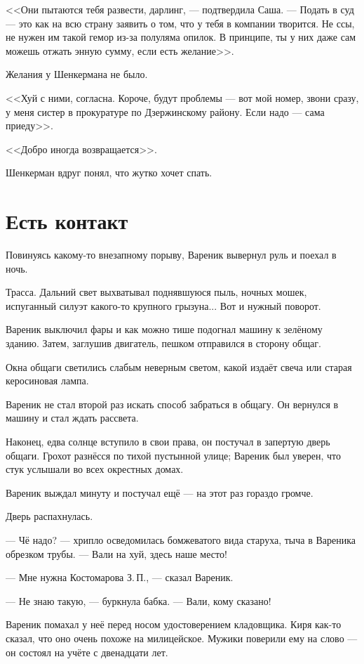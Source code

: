 \documentclass[a4paper,10pt,fleqn]{book}\usepackage{polyglossia}\setdefaultlanguage{english}\setotherlanguage{russian}\defaultfontfeatures{Ligatures=TeX,Mapping=tex-text} \usepackage{xcolor}\definecolor{lightgray}{HTML}{bbbbbb}\color{lightgray}\newcommand{\ml}[3]{\textcolor{black}{#3}}
\begin{document}
<<Они пытаются тебя развести, дарлинг, --- подтвердила Саша.
--- Подать в суд --- это как на всю страну заявить о том, что у тебя в компании творится.
Не ссы, не нужен им такой гемор из-за полуляма опилок.
В принципе, ты у них даже сам можешь отжать энную сумму, если есть желание>>.

Желания у Шенкермана не было.

<<Хуй с ними, согласна.
Короче, будут проблемы --- вот мой номер, звони сразу, у меня систер в прокуратуре по Дзержинскому району.
Если надо --- сама приеду>>.

<<Добро иногда возвращается>>.

Шенкерман вдруг понял, что жутко хочет спать.

\section{Есть контакт}

Повинуясь какому-то внезапному порыву, Вареник вывернул руль и поехал в ночь.

Трасса.
Дальний свет выхватывал поднявшуюся пыль, ночных мошек, испуганный силуэт какого-то крупного грызуна...
Вот и нужный поворот.

Вареник выключил фары и как можно тише подогнал машину к зелёному зданию.
Затем, заглушив двигатель, пешком отправился в сторону общаг.

Окна общаги светились слабым неверным светом, какой издаёт свеча или старая керосиновая лампа.

Вареник не стал второй раз искать способ забраться в общагу.
Он вернулся в машину и стал ждать рассвета.

Наконец, едва солнце вступило в свои права, он постучал в запертую дверь общаги.
Грохот разнёсся по тихой пустынной улице;
Вареник был уверен, что стук услышали во всех окрестных домах.

Вареник выждал минуту и постучал ещё --- на этот раз гораздо громче.

Дверь распахнулась.

--- Чё надо? --- хрипло осведомилась бомжеватого вида старуха, тыча в Вареника обрезком трубы.
--- Вали на хуй, здесь наше место!

--- Мне нужна Костомарова З.\,П., --- сказал Вареник.

--- Не знаю такую, --- буркнула бабка.
--- Вали, кому сказано!

Вареник помахал у неё перед носом удостоверением кладовщика.
Киря как-то сказал, что оно очень похоже на милицейское.
Мужики поверили ему на слово --- он состоял на учёте с двенадцати лет.
\end{document}
